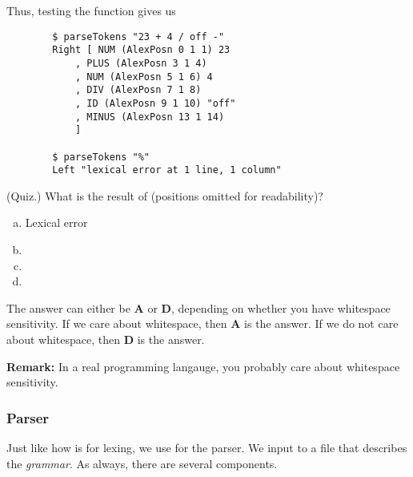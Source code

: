 \documentclass[letterpaper]{article}
\begin{document}
\begin{itemize}
    \bigskip 

    Thus, testing the function gives us 
    \begin{verbatim}
        $ parseTokens "23 + 4 / off -"
        Right [ NUM (AlexPosn 0 1 1) 23
            , PLUS (AlexPosn 3 1 4)
            , NUM (AlexPosn 5 1 6) 4
            , DIV (AlexPosn 7 1 8)
            , ID (AlexPosn 9 1 10) "off"
            , MINUS (AlexPosn 13 1 14) 
            ]
        
        $ parseTokens "%"
        Left "lexical error at 1 line, 1 column"\end{verbatim}
\end{itemize}

\begin{mdframed}[]
    (Quiz.) What is the result of   (positions omitted for readability)?

    \begin{enumerate}[(a)]
        \item Lexical error 
        \item \code{[ID "92zoo"]}
        \item \code{[NUM "92"]}
        \item {}
    \end{enumerate}

    \begin{mdframed}[]
        The answer can either be \textbf{A} or \textbf{D}, depending  on whether you have whitespace sensitivity. If we care about whitespace, then \textbf{A} is the answer. If we do not care about whitespace, then \textbf{D} is the answer. 
    \end{mdframed}
\end{mdframed}
\textbf{Remark:} In a real programming langauge, you probably care about whitespace sensitivity.

\subsubsection{Parser}
Just like how  is for lexing, we use  for the parser. We input to  a  file that describes the \emph{grammar}. As always, there are several components. 
\end{document}
